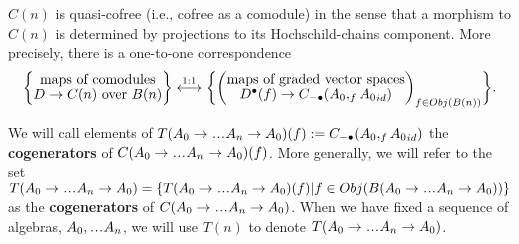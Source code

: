 $C(n)$ is quasi-cofree 
(i.e., cofree as a comodule) in the sense that 
a morphism to $C(n)$ is determined by projections
to its Hochschild-chains component.
More precisely, there is a one-to-one correspondence
\begin{equation}\label{eq:quasicofree}
\bigg\{ \let\scriptstyle\textstyle
\substack{\textrm{maps of comodules}\\
  D \to C(n)\textrm{ over } B(n)}
\bigg\}
\overset{1:1}\longleftrightarrow
\bigg\{ \bigg( \let\scriptstyle\textstyle
\substack{\textrm{maps of graded vector spaces}\\
  D^\bullet(f) \to C_{-\bullet}(A_0, _f{A_0}_{id})}
\bigg)_{f \in Obj(B(n))} \bigg\}.
\end{equation}
%
\begin{defn}\label{def:cogenerators}
We will call elements of 
$T(A_0 \to \smdots A_n \to A_0)(f) :=
C_{-\bullet}(A_0, _f{A_0}_{id})$ 
the \textbf{cogenerators} of 
$C(A_0 \to \smdots A_n \to A_0)(f)$. 
More generally, we will refer to 
the set $T(A_0 \to \smdots A_n \to A_0) 
= \{T(A_0 \to \smdots A_n \to A_0)(f) | 
f \in Obj(B(A_0 \to \smdots A_n \to A_0))\}$ 
as the \textbf{cogenerators} of 
$C(A_0 \to \smdots A_n \to A_0)$. When we 
have fixed a sequence of algebras, 
$A_0, \smdots A_n$, we will 
use $T(n)$ to denote 
$T(A_0 \to \smdots A_n \to A_0)$.
\end{defn}
%
